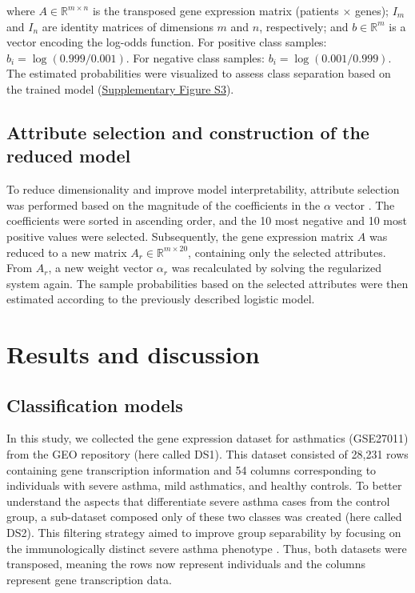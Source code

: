 where $A \in \mathbb{R}^{m \times n}$ is the transposed gene expression matrix (patients $\times$ genes); $I_m$ and $I_n$ are identity matrices of dimensions $m$ and $n$, respectively; and $b \in \mathbb{R}^m$ is a vector encoding the log-odds function. For positive class samples: $b_i = \log(0.999/0.001)$. For negative class samples: $b_i = \log(0.001/0.999)$. The estimated probabilities were visualized to assess class separation based on the trained model (\href{https://github.com/LBS-UFMG/asthma_microarray/blob/main/supplementary_material.pdf}{Supplementary Figure S3}).

\subsection{Attribute selection and construction of the reduced model}

To reduce dimensionality and improve model interpretability, attribute selection was performed based on the magnitude of the coefficients in the $\alpha$ vector %
\cite{liu_logsum_2020,mori_deep_2021}. The coefficients were sorted in ascending order, and the 10 most negative and 10 most positive values were selected. Subsequently, the gene expression matrix $A$ was reduced to a new matrix $A_r \in \mathbb{R}^{m \times 20}$, containing only the selected attributes. From $A_r$, a new weight vector $\alpha_r$ was recalculated by solving the regularized system again. The sample probabilities based on the selected attributes were then estimated according to the previously described logistic model.

\section{Results and discussion} %

\subsection{Classification models} %

In this study, we collected the gene expression dataset for asthmatics (GSE27011) from the GEO repository (here called DS1). This dataset consisted of 28,231 rows containing gene transcription information and 54 columns corresponding to individuals with severe asthma, mild asthmatics, and healthy controls. To better understand the aspects that differentiate severe asthma cases from the control group, a sub-dataset composed only of these two classes was created (here called DS2). This filtering strategy aimed to improve group separability by focusing on the immunologically distinct severe asthma phenotype %
\cite{modena_gene_2017}. Thus, both datasets were transposed, meaning the rows now represent individuals and the columns represent gene transcription data.

